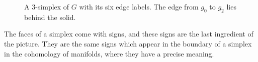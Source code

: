 \begin{figure}[ht]
	\centering
	\caption{A $3$-simplex of $G$ with its six edge labels. The edge from $g_0$ to $g_2$ lies behind the solid.}
	\label{fig:tetrahedron}
\end{figure}

The faces of a simplex come with signs, and these signs are the last ingredient of the picture. They are the same signs which appear in the boundary of a simplex in the cohomology of manifolds, where they have a precise meaning.

